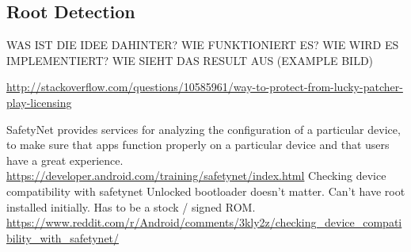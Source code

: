 \subsection{Root Detection}\label{subsection:counter-tampering-root}

WAS IST DIE IDEE DAHINTER? WIE FUNKTIONIERT ES? WIE WIRD ES IMPLEMENTIERT? WIE SIEHT DAS RESULT AUS (EXAMPLE BILD)\newline

\url{http://stackoverflow.com/questions/10585961/way-to-protect-from-lucky-patcher-play-licensing}\newline






SafetyNet provides services for analyzing the configuration of a particular device, to make sure that apps function properly on a particular device and that users have a great experience. \url{https://developer.android.com/training/safetynet/index.html} Checking device compatibility with safetynet\newline
Unlocked bootloader doesn't matter.
Can't have root installed initially.
Has to be a stock / signed ROM.
\url{https://www.reddit.com/r/Android/comments/3kly2z/checking_device_compatibility_with_safetynet/}
